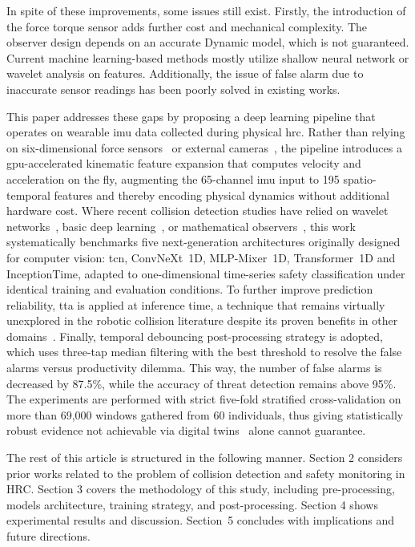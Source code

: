 \documentclass[pdflatex,sn-basic]{sn-jnl}%
\begin{document}
In spite of these improvements, some issues still exist. Firstly, the introduction of the force torque sensor adds further cost and mechanical complexity. The observer design depends on an accurate Dynamic model, which is not guaranteed. Current machine learning-based methods mostly utilize shallow neural network or wavelet analysis on features. Additionally, the issue of false alarm due to inaccurate sensor readings has been poorly solved in existing works.

This paper addresses these gaps by proposing a deep learning pipeline that operates on wearable \ac{imu} data collected during physical \ac{hrc}. Rather than relying on six-dimensional force sensors~\cite{wang2025sixdof} or external cameras~\cite{hoang2024grasp}, the pipeline introduces a \ac{gpu}-accelerated kinematic feature expansion that computes velocity and acceleration on the fly, augmenting the 65-channel \ac{imu} input to 195 spatio-temporal features and thereby encoding physical dynamics without additional hardware cost. Where recent collision detection studies have relied on wavelet networks~\cite{niu2024wavelet}, basic deep learning~\cite{zhao2025zeroforce}, or mathematical observers~\cite{tonti2024eso}, this work systematically benchmarks five next-generation architectures originally designed for computer vision: \ac{tcn}, ConvNeXt~1D, MLP-Mixer~1D, Transformer~1D and InceptionTime, adapted to one-dimensional time-series safety classification under identical training and evaluation conditions. To further improve prediction reliability, \ac{tta} is applied at inference time, a technique that remains virtually unexplored in the robotic collision literature despite its proven benefits in other domains~\cite{fang2024multivariate}. Finally, temporal debouncing post-processing strategy is adopted, which uses three-tap median filtering with the best threshold to resolve the false alarms versus productivity dilemma. This way, the number of false alarms is decreased by 87.5\%, while the accuracy of threat detection remains above 95\%. The experiments are performed with strict five-fold stratified cross-validation on more than 69,000 windows gathered from 60 individuals, thus giving statistically robust evidence not achievable via digital twins~\cite{an2024digitaltwin} alone cannot guarantee.

The rest of this article is structured in the following manner. Section 2 considers prior works related to the problem of collision detection and safety monitoring in HRC. Section 3 covers the methodology of this study, including pre-processing, models architecture, training strategy, and post-processing. Section 4 shows experimental results and discussion. Section~5 concludes with implications and future directions.
\end{document}
